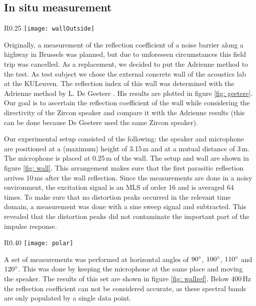 \subsection{In situ measurement}\label{insitu}
\begin{wrapfigure}{R}{0.25\textwidth}
	\vspace{-10pt}
  \centering
    \texttt{[image: wallOutside]}
  \caption{Picture of the wall and setup.}
  \label{fig: wall}
\end{wrapfigure}
Originally, a measurement of the reflection coefficient of a noise barrier along a highway in Brussels was planned, but due to unforeseen circumstances this field trip was cancelled. As a replacement, we decided to put the Adrienne method to the test. As test subject we chose the external concrete wall of the acoustics lab at the KULeuven. The reflection index of this wall was determined with the Adrienne method by L. De Geetere \cite[p.68]{Geetere}. His results are plotted in figure \ref{fig: geetere}. Our goal is to ascertain the reflection coefficient of the wall while considering the directivity of the Zircon speaker and compare it with the Adrienne results (this can be done because De Geetere used the same Zircon speaker). 

Our experimental setup consisted of the following: the speaker and microphone are positioned at a (maximum) height of 3.15\,m and at a mutual distance of 3\,m. The microphone is placed at 0.25\,m of the wall. The setup and wall are shown in figure \ref{fig: wall}. This arrangement makes sure that the first parasitic reflection arrives 10\,ms after the wall reflection. Since the measurements are done in a noisy environment, the excitation signal is an MLS of order 16 and is averaged 64 times. To make sure that no distortion peaks occurred in the relevant time domain, a measurement was done with a sine sweep signal and subtracted. This revealed that the distortion peaks did not contaminate the important part of the impulse response. 

\begin{wrapfigure}{R}{0.40\textwidth}
	\vspace{-10pt}
  \centering
    \texttt{[image: polar]}
  \caption{Angular dependence of the frequency response of the speaker for certain frequencies.}
  \label{fig: polar}
\end{wrapfigure}
A set of measurements was performed at horizontal angles of $90^{\circ}$, $100^{\circ}$, $110^{\circ}$ and $120^{\circ}$. This was done by keeping the microphone at the same place and moving the speaker. The results of this set are shown in figure \ref{fig: wallref}. Below 400\,Hz the reflection coefficient can not be considered accurate, as these spectral bands are only populated by a single data point.

